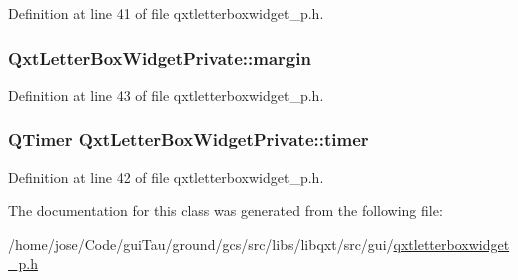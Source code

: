 Definition at line 41 of file qxtletterboxwidget\-\_\-p.\-h.

\hypertarget{class_qxt_letter_box_widget_private_ae00838d6f99b0187e3536bb2f02de399}{
\subsubsection[{margin}]{ Qxt\-Letter\-Box\-Widget\-Private\-::margin}}\label{class_qxt_letter_box_widget_private_ae00838d6f99b0187e3536bb2f02de399}


Definition at line 43 of file qxtletterboxwidget\-\_\-p.\-h.

\hypertarget{class_qxt_letter_box_widget_private_aab23adbcd25387dbfc94c313780ff491}{
\subsubsection[{timer}]{\setlength{\rightskip}{0pt plus 5cm}Q\-Timer Qxt\-Letter\-Box\-Widget\-Private\-::timer}}\label{class_qxt_letter_box_widget_private_aab23adbcd25387dbfc94c313780ff491}


Definition at line 42 of file qxtletterboxwidget\-\_\-p.\-h.



The documentation for this class was generated from the following file\-:\begin{DoxyCompactItemize}
\item 
/home/jose/\-Code/gui\-Tau/ground/gcs/src/libs/libqxt/src/gui/\hyperlink{qxtletterboxwidget__p_8h}{qxtletterboxwidget\-\_\-p.\-h}\end{DoxyCompactItemize}
